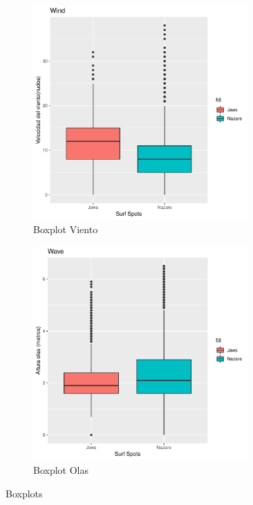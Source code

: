 \begin{figure}[H]
\begin{subfigure}{.49\textwidth}
\label{fig:boxplot_wind}
\centering
\includegraphics[width=0.9\textwidth]{./figures/boxplot_wind.pdf}
  \caption{Boxplot Viento}
\end{subfigure}%
\begin{subfigure}{.49\textwidth}
\label{fig:boxplot_wave}
\centering
\includegraphics[width=0.9\textwidth]{./figures/boxplot_wave.pdf}
  \caption{Boxplot Olas}
\end{subfigure}
\caption{Boxplots}
\end{figure}

